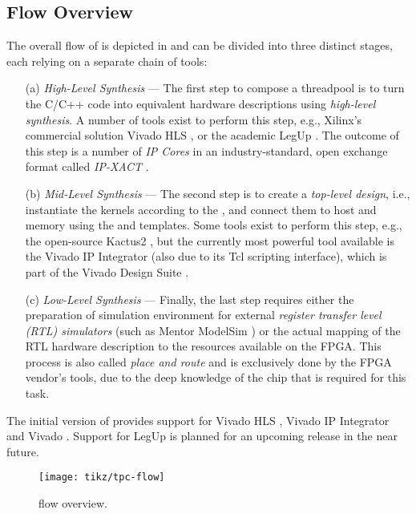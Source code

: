 \subsection*{Flow Overview}\label{sec:flow-overview}%
The overall flow of \tpc{} is depicted in  and can be divided into three distinct stages, each relying on a separate chain of tools:

\begin{enumerate}
  \item[(a)] \emph{High-Level Synthesis} --- The first step to compose a threadpool is to turn the C/C++  code into equivalent hardware descriptions using \emph{high-level synthesis}. A number of tools exist to perform this step, e.g., Xilinx's commercial solution Vivado HLS \cite{vivado-hls}, or the academic LegUp \cite{legup}. The outcome of this step is a number of \emph{IP Cores} in an industry-standard, open exchange format called \emph{IP-XACT} \cite{ip-xact}.
  \item[(b)] \emph{Mid-Level Synthesis} --- The second step is to create a \emph{top-level design}, i.e., instantiate the kernels according to the , and connect them to host and memory using the  and  templates. Some tools exist to perform this step, e.g., the open-source Kactus2 \cite{kactus2}, but the currently most powerful tool available is the Vivado IP Integrator (also due to its Tcl scripting interface), which is part of the Vivado Design Suite \cite{vivado}.
  \item[(c)] \emph{Low-Level Synthesis} --- Finally, the last step requires either the preparation of simulation environment for external \emph{register transfer level (RTL) simulators} (such as Mentor ModelSim \cite{modelsim}) or the actual mapping of the RTL hardware description to the resources available on the FPGA. This process is also called \emph{place and route} and is exclusively done by the FPGA vendor's tools, due to the deep knowledge of the chip that is required for this task.
\end{enumerate}

The initial version of \tpc{} provides support for Vivado HLS \cite{vivado-hls}, Vivado IP Integrator and Vivado \cite{vivado}.
Support for LegUp \cite{legup} is planned for an upcoming release in the near future.

\begin{figure}
  \centering\texttt{[image: tikz/tpc-flow]}
  \caption{\tpc{} flow overview.}
  \label{fig:flow-overview}
\end{figure}

